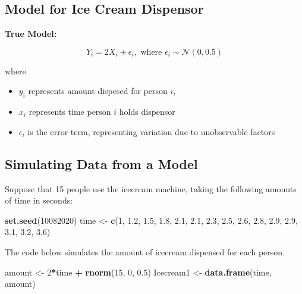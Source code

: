 \documentclass[]{book}
\newenvironment{Shaded}{\begin{snugshade}}{\end{snugshade}}
\newcommand{\KeywordTok}[1]{\textcolor[rgb]{0.13,0.29,0.53}{\textbf{#1}}}
\newcommand{\DecValTok}[1]{\textcolor[rgb]{0.00,0.00,0.81}{#1}}
\newcommand{\FloatTok}[1]{\textcolor[rgb]{0.00,0.00,0.81}{#1}}
\newcommand{\StringTok}[1]{\textcolor[rgb]{0.31,0.60,0.02}{#1}}
\newcommand{\OperatorTok}[1]{\textcolor[rgb]{0.81,0.36,0.00}{\textbf{#1}}}
\newcommand{\NormalTok}[1]{#1}
\providecommand{\tightlist}{%
  \setlength{\itemsep}{0pt}\setlength{\parskip}{0pt}}
\begin{document}
\subsection{Model for Ice Cream
Dispensor}\label{model-for-ice-cream-dispensor}

\textbf{True Model:}

\[
Y_i = 2X_i+\epsilon_i, \text{ where } \epsilon_i \sim \mathcal{N}(0,0.5)
\]

where

\begin{itemize}
\tightlist
\item
  \(y_i\) represents amount dispesed for person \(i\),\\
\item
  \(x_i\) represents time person \(i\) holds dispensor\\
\item
  \(\epsilon_i\) is the error term, representing variation due to
  unobservable factors
\end{itemize}

\subsection{Simulating Data from a
Model}\label{simulating-data-from-a-model}

Suppose that 15 people use the icecream machine, taking the following
amounts of time in seconds:

\begin{Shaded}
\begin{Highlighting}[]
\KeywordTok{set.seed}\NormalTok{(}\DecValTok{10082020}\NormalTok{)}
\NormalTok{time <-}\StringTok{ }\KeywordTok{c}\NormalTok{(}\DecValTok{1}\NormalTok{, }\FloatTok{1.2}\NormalTok{, }\FloatTok{1.5}\NormalTok{, }\FloatTok{1.8}\NormalTok{, }\FloatTok{2.1}\NormalTok{, }\FloatTok{2.1}\NormalTok{, }\FloatTok{2.3}\NormalTok{, }\FloatTok{2.5}\NormalTok{, }\FloatTok{2.6}\NormalTok{, }\FloatTok{2.8}\NormalTok{, }\FloatTok{2.9}\NormalTok{, }\FloatTok{2.9}\NormalTok{, }\FloatTok{3.1}\NormalTok{, }\FloatTok{3.2}\NormalTok{, }\FloatTok{3.6}\NormalTok{)}
\end{Highlighting}
\end{Shaded}

The code below simulates the amount of icecream dispensed for each
person.

\begin{Shaded}
\begin{Highlighting}[]
\NormalTok{amount <-}\StringTok{ }\DecValTok{2}\OperatorTok{*}\NormalTok{time }\OperatorTok{+}\StringTok{ }\KeywordTok{rnorm}\NormalTok{(}\DecValTok{15}\NormalTok{, }\DecValTok{0}\NormalTok{, }\FloatTok{0.5}\NormalTok{)}
\NormalTok{Icecream1 <-}\StringTok{ }\KeywordTok{data.frame}\NormalTok{(time, amount)}
\end{Highlighting}
\end{Shaded}
\end{document}
